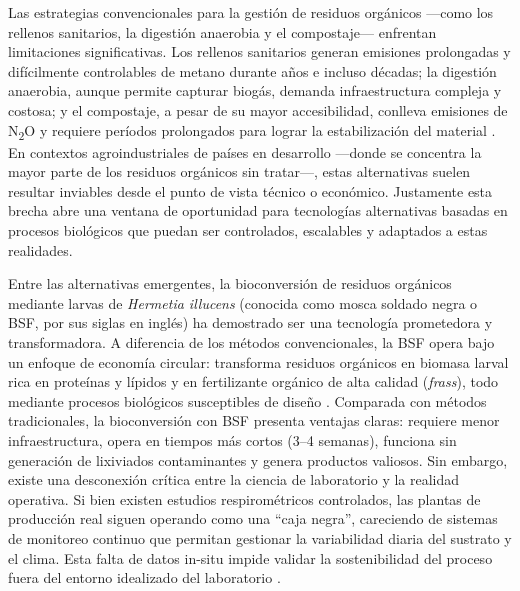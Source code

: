 Las estrategias convencionales para la gestión de residuos orgánicos —como los rellenos sanitarios, la digestión anaerobia y el compostaje— enfrentan limitaciones significativas. Los rellenos sanitarios generan emisiones prolongadas y difícilmente controlables de metano durante años e incluso décadas; la digestión anaerobia, aunque permite capturar biogás, demanda infraestructura compleja y costosa; y el compostaje, a pesar de su mayor accesibilidad, conlleva emisiones de N\textsubscript{2}O y requiere períodos prolongados para lograr la estabilización del material \parencite{kongEvaluatingGreenhouseGas2012,nordahlGreenhouseGasAir2023}. En contextos agroindustriales de países en desarrollo —donde se concentra la mayor parte de los residuos orgánicos sin tratar—, estas alternativas suelen resultar inviables desde el punto de vista técnico o económico. Justamente esta brecha abre una ventana de oportunidad para tecnologías alternativas basadas en procesos biológicos que puedan ser controlados, escalables y adaptados a estas realidades.

Entre las alternativas emergentes, la bioconversión de residuos orgánicos mediante larvas de \textit{Hermetia illucens} (conocida como mosca soldado negra o BSF, por sus siglas en inglés) ha demostrado ser una tecnología prometedora y transformadora. A diferencia de los métodos convencionales, la BSF opera bajo un enfoque de economía circular: transforma residuos orgánicos en biomasa larval rica en proteínas y lípidos y en fertilizante orgánico de alta calidad (\textit{frass}), todo mediante procesos biológicos susceptibles de diseño \parencite{bermudezComprehensiveUtilizationBlack2023,Surendra2016}. Comparada con métodos tradicionales, la bioconversión con BSF presenta ventajas claras: requiere menor infraestructura, opera en tiempos más cortos (3--4 semanas), funciona sin generación de lixiviados contaminantes y genera productos valiosos. Sin embargo, existe una desconexión crítica entre la ciencia de laboratorio y la realidad operativa. Si bien existen estudios respirométricos controlados, las plantas de producción real siguen operando como una ``caja negra'', careciendo de sistemas de monitoreo continuo que permitan gestionar la variabilidad diaria del sustrato y el clima. Esta falta de datos in-situ impide validar la sostenibilidad del proceso fuera del entorno idealizado del laboratorio \parencite{jenkinsProcessingPoultryManure2025}.

